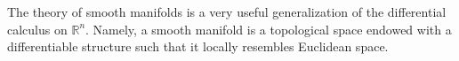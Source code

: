The theory of smooth manifolds is a very useful generalization of the differential calculus on \(\mathbb{R}^n\). Namely, a smooth manifold is a topological space endowed with a differentiable structure such that it locally resembles Euclidean space.







